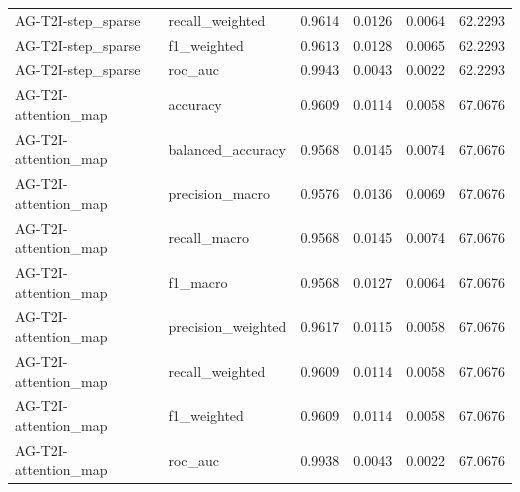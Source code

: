 \begin{tabular}{llrrrr}
AG-T2I-step_sparse & recall_weighted & 0.9614 & 0.0126 & 0.0064 & 62.2293 \\
AG-T2I-step_sparse & f1_weighted & 0.9613 & 0.0128 & 0.0065 & 62.2293 \\
AG-T2I-step_sparse & roc_auc & 0.9943 & 0.0043 & 0.0022 & 62.2293 \\
AG-T2I-attention_map & accuracy & 0.9609 & 0.0114 & 0.0058 & 67.0676 \\
AG-T2I-attention_map & balanced_accuracy & 0.9568 & 0.0145 & 0.0074 & 67.0676 \\
AG-T2I-attention_map & precision_macro & 0.9576 & 0.0136 & 0.0069 & 67.0676 \\
AG-T2I-attention_map & recall_macro & 0.9568 & 0.0145 & 0.0074 & 67.0676 \\
AG-T2I-attention_map & f1_macro & 0.9568 & 0.0127 & 0.0064 & 67.0676 \\
AG-T2I-attention_map & precision_weighted & 0.9617 & 0.0115 & 0.0058 & 67.0676 \\
AG-T2I-attention_map & recall_weighted & 0.9609 & 0.0114 & 0.0058 & 67.0676 \\
AG-T2I-attention_map & f1_weighted & 0.9609 & 0.0114 & 0.0058 & 67.0676 \\
AG-T2I-attention_map & roc_auc & 0.9938 & 0.0043 & 0.0022 & 67.0676 \\
\bottomrule
\end{tabular}
